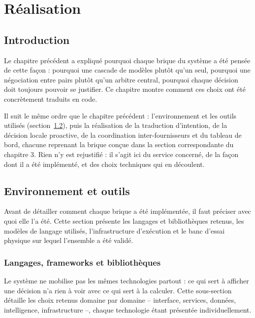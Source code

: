 \newpage
\pagestyle{fancy}

\renewcommand{\headrulewidth}{0.5pt}
\renewcommand{\footrulewidth}{0.5pt}
\chapter{Réalisation}\setlength{\headheight}{27.06pt}
\label{ch4}
\minitoc

\newpage
\section{Introduction}
Le chapitre précédent a expliqué pourquoi chaque brique du système a été pensée de cette façon : pourquoi une cascade de modèles plutôt qu'un seul, pourquoi une négociation entre pairs plutôt qu'un arbitre central, pourquoi chaque décision doit toujours pouvoir se justifier. Ce chapitre montre comment ces choix ont été concrètement traduits en code.

Il suit le même ordre que le chapitre précédent : l'environnement et les outils utilisés (section~\ref{sec:realisation-environnement}), puis la réalisation de la traduction d'intention, de la décision locale proactive, de la coordination inter-fournisseurs et du tableau de bord, chacune reprenant la brique conçue dans la section correspondante du chapitre 3. Rien n'y est rejustifié : il s'agit ici du service concerné, de la façon dont il a été implémenté, et des choix techniques qui en découlent.
\section{Environnement et outils}
\label{sec:realisation-environnement}

Avant de détailler comment chaque brique a été implémentée, il faut préciser avec quoi elle l'a été. Cette section présente les langages et bibliothèques retenus, les modèles de langage utilisés, l'infrastructure d'exécution et le banc d'essai physique sur lequel l'ensemble a été validé.

\subsection{Langages, frameworks et bibliothèques}

Le système ne mobilise pas les mêmes technologies partout : ce qui sert à afficher une décision n'a rien à voir avec ce qui sert à la calculer. Cette sous-section détaille les choix retenus domaine par domaine -- interface, services, données, intelligence, infrastructure --, chaque technologie étant présentée individuellement.

